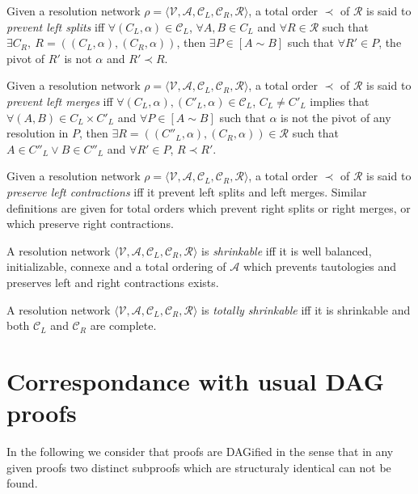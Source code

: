 \documentclass{article}
\newcommand{\varSet}{\mathcal{V}}
\newcommand{\axiomSet}{\mathcal{A}}
\newcommand{\conSet}{\mathcal{C}}
\newcommand{\resoSet}{\mathcal{R}}
\newcommand{\resoNet}{\rho}
\newcommand{\resoOrd}{\prec}
\newcommand{\connected}{\sim}
\newcommand{\cpath}[2]{\left[ #1 \connected #2 \right]}
\begin{document}
Given a resolution network $\resoNet = \langle \varSet, \axiomSet, \conSet_L, \conSet_R, \resoSet
\rangle$, a total order $\resoOrd$ of $\resoSet$ is said to \emph{prevent left splits} iff
$\forall (C_L,\alpha) \in \conSet_L$, $\forall A, B \in C_L$ and
$\forall R \in \resoSet$ such that $\exists C_R ,~ R = ((C_L,\alpha),(C_R,\alpha))$, then
$\exists P \in \cpath{A}{B}$ such that $\forall R' \in P$, the pivot of $R'$ is
not $\alpha$ and $R' \resoOrd R$.

Given a resolution network $\resoNet = \langle \varSet, \axiomSet, \conSet_L, \conSet_R, \resoSet
\rangle$, a total order $\resoOrd$ of $\resoSet$ is said to \emph{prevent left merges} iff
$\forall (C_L,\alpha), (C'_L,\alpha) \in \conSet_L$, $C_L \neq C'_L$ implies that
$\forall (A,B) \in C_L \times C'_L$ and
$\forall P \in \cpath{A}{B}$ such that $\alpha$ is not the pivot of any resolution in $P$, then
$\exists R = ((C''_L,\alpha),(C_R,\alpha)) \in \resoSet$ such that
$A \in C''_L \vee B \in C''_L$ and $\forall R' \in P$, $R \resoOrd R'$.

Given a resolution network $\resoNet = \langle \varSet, \axiomSet, \conSet_L, \conSet_R, \resoSet
\rangle$, a total order $\resoOrd$ of $\resoSet$ is said to \emph{preserve left contractions} iff
it prevent left splits and left merges. Similar definitions are given for total orders which prevent
right splits or right merges, or which preserve right contractions.

A resolution network $\langle \varSet, \axiomSet, \conSet_L, \conSet_R, \resoSet \rangle$ is
\emph{shrinkable} iff it is well balanced, initializable, connexe and a total ordering of
$\axiomSet$ which prevents tautologies and preserves left and right contractions exists.

A resolution network $\langle \varSet, \axiomSet, \conSet_L, \conSet_R, \resoSet \rangle$ is
\emph{totally shrinkable} iff it is shrinkable and both $\conSet_L$ and $\conSet_R$ are complete.





\section{Correspondance with usual DAG proofs}

In the following we consider that proofs are DAGified in the sense that in any given proofs two
distinct subproofs which are structuraly identical can not be found.
\end{document}
